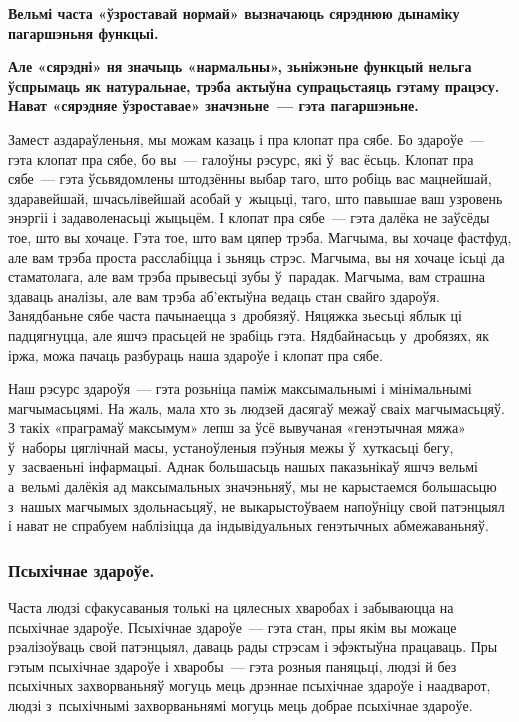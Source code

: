 \textbf{Вельмі часта «ўзроставай нормай» вызначаюць сярэднюю дынаміку пагаршэньня функцыі.}

\textbf{Але «сярэдні» ня значыць «нармальны», зьніжэньне функцый нельга ўспрымаць як натуральнае, трэба актыўна супрацьстаяць гэтаму працэсу. Нават «сярэдняе ўзроставае» значэньне~--- гэта пагаршэньне.}

Замест аздараўленьня, мы можам казаць і пра клопат пра сябе. Бо здароўе~--- гэта клопат пра сябе, бо вы~--- галоўны рэсурс, які ў~вас ёсьць. Клопат пра сябе~--- гэта ўсьвядомлены штодзённы выбар таго, што робіць вас мацнейшай, здаравейшай, шчасьлівейшай асобай у~жыцьці, таго, што павышае ваш узровень энэргіі і задаволенасьці жыцьцём. І клопат пра сябе~--- гэта далёка не заўсёды тое, што вы хочаце. Гэта тое, што вам цяпер трэба. Магчыма, вы хочаце фастфуд, але вам трэба проста расслабіцца і зьняць стрэс. Магчыма, вы ня хочаце ісьці да стаматолага, але вам трэба прывесьці зубы ў~парадак. Магчыма, вам страшна здаваць аналізы, але вам трэба аб'ектыўна ведаць стан свайго здароўя. Занядбаньне сябе часта пачынаецца з~дробязяў. Няцяжка зьесьці яблык ці падцягнуцца, але яшчэ прасьцей не зрабіць гэта. Нядбайнасьць у~дробязях, як іржа, можа пачаць разбураць наша здароўе і клопат пра сябе.


Наш рэсурс здароўя~--- гэта розьніца паміж максымальнымі і мінімальнымі магчымасьцямі. На жаль, мала хто зь людзей дасягаў межаў сваіх магчымасьцяў. З такіх «праграмаў максымум» лепш за ўсё вывучаная «генэтычная мяжа» ў~наборы цяглічнай масы, устаноўленыя пэўныя межы ў~хуткасьці бегу, у~засваеньні інфармацыі. Аднак большасьць нашых паказьнікаў яшчэ вельмі а~вельмі далёкія ад максымальных значэньняў, мы не карыстаемся большасьцю з~нашых магчымых здольнасьцяў, не выкарыстоўваем напоўніцу свой патэнцыял і нават не спрабуем наблізіцца да індывідуальных генэтычных абмежаваньняў.

\subsubsection{Псыхічнае здароўе.}

Часта людзі сфакусаваныя толькі на цялесных хваробах і забываюцца на псыхічнае здароўе. Псыхічнае здароўе~--- гэта стан, пры якім вы можаце рэалізоўваць свой патэнцыял, даваць рады стрэсам і эфэктыўна працаваць. Пры гэтым псыхічнае здароўе і хваробы~--- гэта розныя паняцьці, людзі й без псыхічных захворваньняў могуць мець дрэннае псыхічнае здароўе і наадварот, людзі з~псыхічнымі захворваньнямі могуць мець добрае псыхічнае здароўе.

